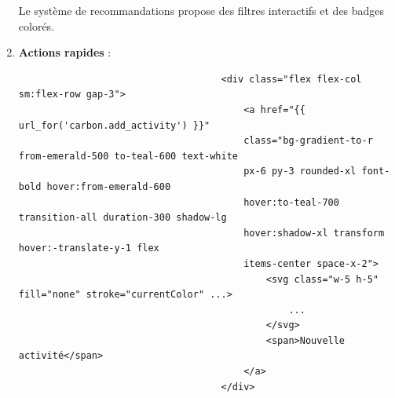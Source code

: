 \documentclass[a4paper,11pt]{article}
\begin{document}
\begin{enumerate}
                            \noindent Le système de recommandations propose des filtres interactifs et des badges colorés.

                        \item \textbf{Actions rapides} :
                            \begin{tcolorbox}[colback=lightgray!6, colframe=black, left=-70mm, right=5mm, top=2mm, bottom=0mm, boxrule=0.1mm]
                                \begin{verbatim}
                                    <div class="flex flex-col sm:flex-row gap-3">
                                        <a href="{{ url_for('carbon.add_activity') }}" 
                                        class="bg-gradient-to-r from-emerald-500 to-teal-600 text-white 
                                        px-6 py-3 rounded-xl font-bold hover:from-emerald-600 
                                        hover:to-teal-700 transition-all duration-300 shadow-lg 
                                        hover:shadow-xl transform hover:-translate-y-1 flex 
                                        items-center space-x-2">
                                            <svg class="w-5 h-5" fill="none" stroke="currentColor" ...>
                                                ...
                                            </svg>
                                            <span>Nouvelle activité</span>
                                        </a>
                                    </div>
                                \end{verbatim}
                            \end{tcolorbox}


\end{enumerate}
\end{document}
